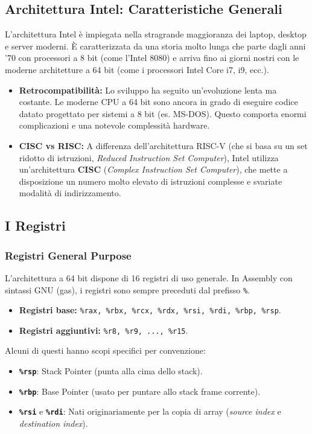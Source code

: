 \documentclass[12pt, a4paper]{article}
\begin{document}
\subsection{Architettura Intel: Caratteristiche Generali}
L'architettura Intel è impiegata nella stragrande maggioranza dei laptop, desktop e server moderni. È caratterizzata da una storia molto lunga che parte dagli anni '70 con processori a 8 bit (come l'Intel 8080) e arriva fino ai giorni nostri con le moderne architetture a 64 bit (come i processori Intel Core i7, i9, ecc.).
\begin{itemize}
    \item \textbf{Retrocompatibilità:} Lo sviluppo ha seguito un'evoluzione lenta ma costante. Le moderne CPU a 64 bit sono ancora in grado di eseguire codice datato progettato per sistemi a 8 bit (es. MS-DOS). Questo comporta enormi complicazioni e una notevole complessità hardware.
    \item \textbf{CISC vs RISC:} A differenza dell'architettura RISC-V (che si basa su un set ridotto di istruzioni, \textit{Reduced Instruction Set Computer}), Intel utilizza un'architettura \textbf{CISC} (\textit{Complex Instruction Set Computer}), che mette a disposizione un numero molto elevato di istruzioni complesse e svariate modalità di indirizzamento.
\end{itemize}

\subsection{I Registri}
\subsubsection{Registri General Purpose}
L'architettura a 64 bit dispone di 16 registri di uso generale. In Assembly con sintassi GNU (gas), i registri sono sempre preceduti dal prefisso \texttt{\%}.
\begin{itemize}
    \item \textbf{Registri base:} \texttt{\%rax, \%rbx, \%rcx, \%rdx, \%rsi, \%rdi, \%rbp, \%rsp}.
    \item \textbf{Registri aggiuntivi:} \texttt{\%r8, \%r9, ..., \%r15}.
\end{itemize}
Alcuni di questi hanno scopi specifici per convenzione:
\begin{itemize}
    \item \texttt{\textbf{\%rsp}}: Stack Pointer (punta alla cima dello stack).
    \item \texttt{\textbf{\%rbp}}: Base Pointer (usato per puntare allo stack frame corrente).
    \item \texttt{\textbf{\%rsi}} e \texttt{\textbf{\%rdi}}: Nati originariamente per la copia di array (\textit{source index} e \textit{destination index}).
\end{itemize}
\end{document}
